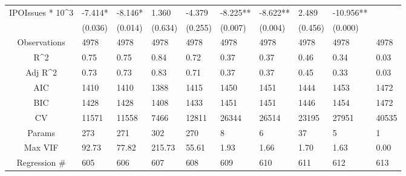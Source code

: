 \documentclass{article}
\begin{document}
\begin{table}[H]
\begin{tabular}{|clllllllll|}
  IPOIssues * 10^3 & -7.414* & -8.146* & 1.360 & -4.379 & -8.225** & -8.622** & 2.489 & -10.956** &  \\ 
   & (0.036) & (0.014) & (0.634) & (0.255) & (0.007) & (0.004) & (0.456) & (0.000) &  \\ 
  \hline 
 Observations & 4978 & 4978 & 4978 & 4978 & 4978 & 4978 & 4978 & 4978 & 4978 \\ 
  R^2 & 0.75 & 0.75 & 0.84 & 0.72 & 0.37 & 0.37 & 0.46 & 0.34 & 0.03 \\ 
  Adj R^2 & 0.73 & 0.73 & 0.83 & 0.71 & 0.37 & 0.37 & 0.45 & 0.33 & 0.03 \\ 
  AIC & 1410 & 1410 & 1388 & 1415 & 1450 & 1451 & 1444 & 1453 & 1472 \\ 
  BIC & 1428 & 1428 & 1408 & 1433 & 1451 & 1451 & 1446 & 1454 & 1472 \\ 
  CV & 11571 & 11558 & 7466 & 12811 & 26344 & 26514 & 23195 & 27951 & 40535 \\ 
  Params & 273 & 271 & 302 & 270 & 8 & 6 & 37 & 5 & 1 \\ 
  Max VIF & 92.73 & 77.82 & 215.73 & 55.61 & 1.93 & 1.66 & 1.70 & 1.63 & 0.00 \\ 
  Regression \# & 605 & 606 & 607 & 608 & 609 & 610 & 611 & 612 & 613 \\ 
   \hline
\end{tabular}
 
\end{table}
\end{document}
